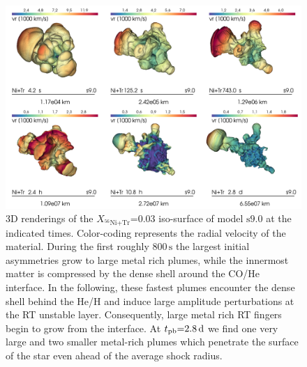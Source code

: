 \documentclass[fleqn,usenatbib]{mnras}
\newcommand{\tpb}{\ensuremath{t_{\text{pb}}}}
\newcommand{\nickel}{\ensuremath{\mathrm{^{56}Ni}}\xspace}
\newcommand{\tracer}{\ensuremath{\mathrm{Tr}}\xspace}
\newcommand{\s}{\ensuremath{\text{s}}}
\newcommand{\snine}{\ensuremath{\mathrm{s9.0}}\xspace}
\begin{document}
\begin{figure}%
\includegraphics[width=\textwidth]{pic/s9_tile_2_3.png}
    \caption{3D renderings of the $X_{\nickel\mathord{+}\tracer}\mathord{=}0.03$ 
             iso-surface of model \snine at the indicated times. Color-coding represents the radial velocity of the material. During the first roughly $800\,\s$ the largest initial asymmetries grow to large metal rich plumes, while the innermost matter is compressed by the dense shell around the CO/He interface. In the following, these fastest plumes encounter the dense shell behind the He/H and induce large amplitude perturbations at the RT unstable layer. Consequently, large metal rich RT fingers begin to grow from the interface. At $\tpb\mathord{=}2.8\,\rm d$ we find one very large and two smaller metal-rich plumes which penetrate the surface of the star even ahead of the average shock radius.}
\label{fig:s9 3d rendering}
\end{figure}%
\end{document}
